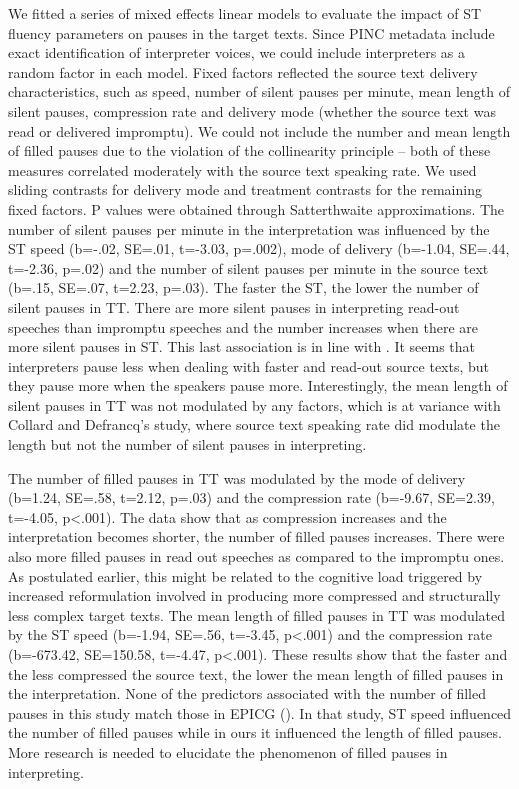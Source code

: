 \documentclass[output=paper]{langscibook}
\begin{document}
We fitted a series of mixed effects linear models to evaluate the impact of ST fluency parameters on pauses in the target texts. Since PINC metadata include exact identification of interpreter voices, we could include interpreters as a random factor in each model. Fixed factors reflected the source text delivery characteristics, such as speed, number of silent pauses per minute, mean length of silent pauses, compression rate and delivery mode (whether the source text was read or delivered impromptu). We could not include the number and mean length of filled pauses due to the violation of the collinearity principle – both of these measures correlated moderately with the source text speaking rate. We used sliding contrasts for delivery mode and treatment contrasts for the remaining fixed factors. P values were obtained through Satterthwaite approximations. The number of silent pauses per minute in the interpretation was influenced by the ST speed (b=-.02, SE=.01, t=-3.03, p=.002), mode of delivery (b=-1.04, SE=.44, t=-2.36, p=.02) and the number of silent pauses per minute in the source text (b=.15, SE=.07, t=2.23, p=.03). The faster the ST, the lower the number of silent pauses in TT. There are more silent pauses in interpreting read-out speeches than impromptu speeches and the number increases when there are more silent pauses in ST. This last association is in line with \citet{CollardDefrancq2019}. It seems that interpreters pause less when dealing with faster and read-out source texts, but they pause more when the speakers pause more. Interestingly, the mean length of silent pauses in TT was not modulated by any factors, which is at variance with Collard and Defrancq’s study, where source text speaking rate did modulate the length but not the number of silent pauses in interpreting.

The number of filled pauses in TT was modulated by the mode of delivery (b=1.24, SE=.58, t=2.12, p=.03) and the compression rate (b=-9.67, SE=2.39, t=-4.05, p<.001). The data show that as compression increases and the interpretation becomes shorter, the number of filled pauses increases. There were also more filled pauses in read out speeches as compared to the impromptu ones. As postulated earlier, this might be related to the cognitive load triggered by increased reformulation involved in producing more compressed and structurally less complex target texts. The mean length of filled pauses in TT was modulated by the ST speed (b=-1.94, SE=.56, t=-3.45, p<.001) and the compression rate (b=-673.42, SE=150.58, t=-4.47, p<.001). These results show that the faster and the less compressed the source text, the lower the mean length of filled pauses in the interpretation. None of the predictors associated with the number of filled pauses in this study match those in EPICG (\citealt{CollardDefrancq2019}). In that study, ST speed influenced the number of filled pauses while in ours it influenced the length of filled pauses. More research is needed to elucidate the phenomenon of filled pauses in interpreting.
\end{document}
